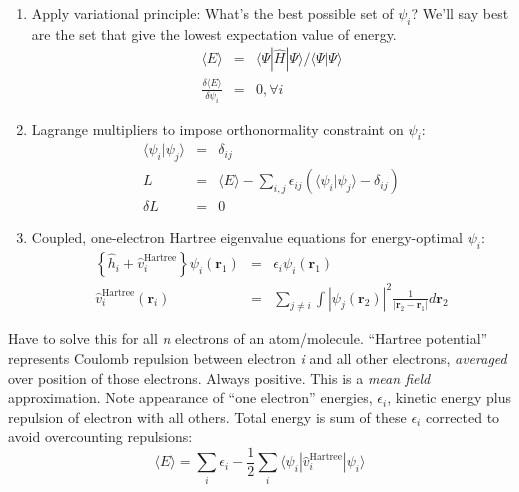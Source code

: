 \documentclass[11pt]{article}
\begin{document}
\begin{enumerate}
\item Apply variational principle: What's the best possible set of \(\psi_i\)?  We'll say best are the set that give the lowest expectation value of energy.
\begin{eqnarray}
\langle E \rangle & = & \langle \Psi | \hat{H} | \Psi \rangle /\langle \Psi | \Psi\rangle \\
\frac{ \delta \langle E \rangle}{\delta \psi_i} &= &0, \forall i
\end{eqnarray}
\item Lagrange multipliers to impose orthonormality constraint on \(\psi_i\):
\begin{eqnarray}
  \langle \psi_i | \psi_j \rangle &=& \delta_{ij} \\
   L & = & \langle E \rangle - \sum_{i,j}\epsilon_{ij}\left ( \langle \psi_i | \psi_j \rangle - \delta_{ij} \right ) \\
 \delta L &=& 0
 \end{eqnarray}
\item Coupled, one-electron Hartree eigenvalue equations for energy-optimal \(\psi_i\):
\begin{eqnarray}
 \left \{ \hat{h}_i + \hat{v}^{\text{Hartree}}_i \right \} \psi_i(\mathbf{r}_1) &=&         \epsilon_i      \psi_i(\mathbf{r}_1) \\
   \hat{v}^{\text{Hartree}}_i(\mathbf{r}_i) & =& \sum_{j\ne i} \int \left | \psi_j(\mathbf{r}_2) \right      |^2\frac{1}{|\mathbf{r}_2-\mathbf{r}_1|}d\mathbf{r}_2
       \end{eqnarray}
\end{enumerate}
Have to solve this for all \emph{n} electrons of an atom/molecule. ``Hartree potential'' represents Coulomb repulsion between electron \emph{i} and all other electrons, \emph{averaged} over position of those electrons.  Always positive.  This is a \emph{mean field} approximation.  Note appearance of ``one electron'' energies, \(\epsilon_i\), kinetic energy plus repulsion of electron with all others.  Total energy is sum of these \(\epsilon_i\) corrected to avoid overcounting repulsions:
\[ \langle E \rangle = \sum_i \epsilon_i - \frac{1}{2}\sum_i \langle \psi_i| \hat{v}^{\text{Hartree}}_i|\psi_i\rangle \]
\end{document}
